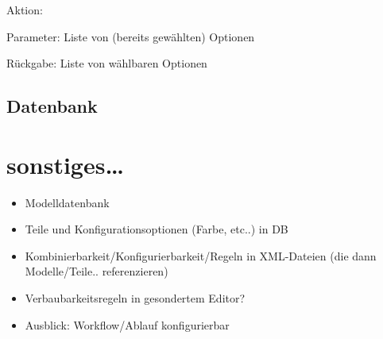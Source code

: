 \documentclass[a4paper,10pt]{article}
\begin{document}
Aktion:
 

Parameter:
 Liste von (bereits gewählten) Optionen

Rückgabe:
 Liste von wählbaren Optionen

\subsection*{Datenbank}


\section{sonstiges\ldots}
\begin{itemize}
 \item Modelldatenbank
 \item Teile und Konfigurationsoptionen (Farbe, etc..) in DB
 \item Kombinierbarkeit/Konfigurierbarkeit/Regeln in XML-Dateien (die dann Modelle/Teile.. referenzieren)
 \item Verbaubarkeitsregeln in gesondertem Editor?
 \item Ausblick: Workflow/Ablauf konfigurierbar
\end{itemize}
\end{document}
